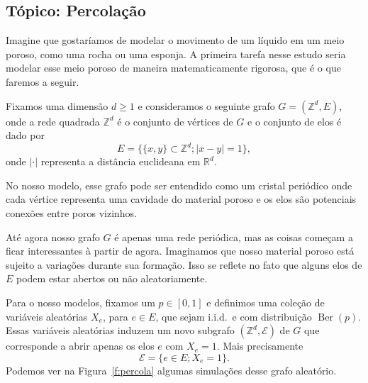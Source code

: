 \documentclass[reqno, final]{book}
\newcommand*\1{\mathds{1}}
\DeclareMathOperator{\Ber}{Ber}
\def \iid{i.i.d.~}
\begin{document}
\vfill
\pagebreak

\subsection{Tópico: Percolação}

Imagine que gostaríamos de modelar o movimento de um líquido em um meio poroso, como uma rocha ou uma esponja.
A primeira tarefa nesse estudo seria modelar esse meio poroso de maneira matematicamente rigorosa, que é o que faremos a seguir.

Fixamos uma dimensão $d \geq 1$ e consideramos o seguinte grafo $G = (\mathbb{Z}^d, E)$, onde a rede quadrada $\mathbb{Z}^d$ é o conjunto de vértices de $G$ e o conjunto de elos é dado por
\begin{equation*}
  E = \big\{ \{x, y\} \subset \mathbb{Z}^d; |x - y| = 1 \},
\end{equation*}
onde $|\cdot|$ representa a distância euclideana em $\mathbb{R}^d$.

No nosso modelo, esse grafo pode ser entendido como um cristal periódico onde cada vértice representa uma cavidade do material poroso e os elos são potenciais conexões entre poros vizinhos.

Até agora nosso grafo $G$ é apenas uma rede periódica, mas as coisas começam a ficar interessantes à partir de agora.
Imaginamos que nosso material poroso está sujeito a variações durante sua formação.
Isso se reflete no fato que alguns elos de $E$ podem estar abertos ou não aleatoriamente.

Para o nosso modelos, fixamos um $p \in [0,1]$ e definimos uma coleção de variáveis aleatórias $X_e$, para $e \in E$, que sejam \iid e com distribuição $\Ber(p)$.
Essas variáveis aleatórias induzem um novo subgrafo $(\mathbb{Z}^d, \mathcal{E})$ de $G$ que corresponde a abrir apenas os elos $e$ com $X_e = 1$.
Mais precisamente
\begin{equation}
  \mathcal{E} = \big\{ e \in E; X_e = 1 \big\}.
\end{equation}
Podemos ver na Figura~\ref{f:percola} algumas simulações desse grafo aleatório.
\end{document}

